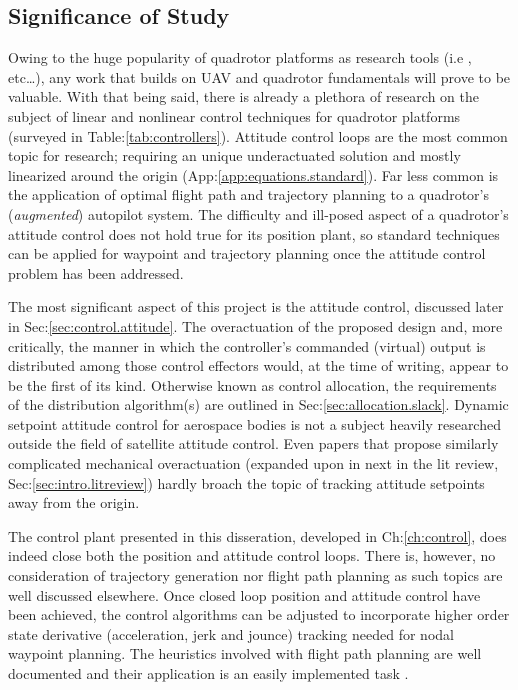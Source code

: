 \subsection{Significance of Study}
\label{subsec:intro.foreword.significance}
Owing to the huge popularity of quadrotor platforms as research tools (i.e \cite{x4flyercontrol,intelligentbackstep,fullquadcoptercontrol}, etc\ldots), any work that builds on UAV and quadrotor fundamentals will prove to be valuable. With that being said, there is already a plethora of research on the subject of linear and nonlinear control techniques for quadrotor platforms (surveyed in Table:\ref{tab:controllers}). Attitude control loops are the most common topic for research; requiring an unique underactuated solution and mostly linearized around the origin (App:\ref{app:equations.standard}). Far less common is the application of optimal flight path and trajectory planning to a quadrotor's (\emph{augmented}) autopilot system. The difficulty and ill-posed aspect of a quadrotor's attitude control does not hold true for its position plant, so standard techniques can be applied for waypoint and trajectory planning once the attitude control problem has been addressed.
\par
The most significant aspect of this project is the attitude control, discussed later in Sec:\ref{sec:control.attitude}. The overactuation of the proposed design and, more critically, the manner in which the controller's commanded (virtual) output is distributed among those control effectors would, at the time of writing, appear to be the first of its kind. Otherwise known as control allocation, the requirements of the distribution algorithm(s) are outlined in Sec:\ref{sec:allocation.slack}. Dynamic setpoint attitude control for aerospace bodies is not a subject heavily researched outside the field of satellite attitude control. Even papers that propose similarly complicated mechanical overactuation (expanded upon in next in the lit review, Sec:\ref{sec:intro.litreview}) hardly broach the topic of tracking attitude setpoints away from the origin.
\par
The control plant presented in this disseration, developed in Ch:\ref{ch:control}, does indeed close both the position and attitude control loops. There is, however, no consideration of trajectory generation nor flight path planning as such topics are well discussed elsewhere. Once closed loop position and attitude control have been achieved, the control algorithms can be adjusted to incorporate higher order state derivative (acceleration, jerk and jounce) tracking needed for nodal waypoint planning. The heuristics involved with flight path planning are well documented and their application is an easily implemented task \cite{trajectorygeneration,modelingquadcopter,trajectorytracking}.
